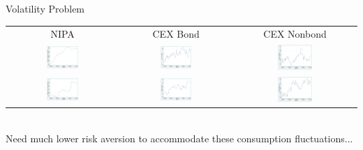 \documentclass{beamer}
\begin{document}
\begin{frame}{Volatility Problem}
\begin{center}
\begin{tabular}{ccc}
NIPA & CEX Bond & CEX Nonbond \\
\includegraphics[width=0.3\textwidth]{figs/series/nipa_log-consumption} & \includegraphics[width=0.3\textwidth]{figs/series/cex-bondholders_log-consumption} & \includegraphics[width=0.3\textwidth]{figs/series/cex-nonbondholders_log-consumption} \\
\includegraphics[width=0.3\textwidth]{figs/series/nipa_scaled-leisure-pct} & \includegraphics[width=0.3\textwidth]{figs/series/cex-bondholders_scaled-leisure-pct} & \includegraphics[width=0.3\textwidth]{figs/series/cex-nonbondholders_scaled-leisure-pct}
\end{tabular} \\
Need much lower risk aversion to accommodate these consumption fluctuations...
\end{center}
\end{frame}
\end{document}
